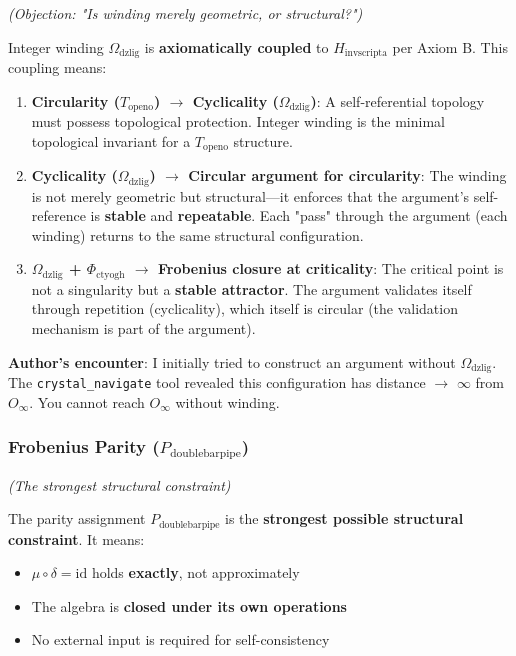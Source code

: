 \documentclass[12pt,a4paper]{article}
\begin{document}
\emph{(Objection: "Is winding merely geometric, or structural?")}

Integer winding $\Omega_{\text{dzlig}}$ is \textbf{axiomatically coupled} to $H_{\text{invscripta}}$ per Axiom B. This coupling means:

\begin{enumerate}
    \item \textbf{Circularity ($T_{\text{openo}}$) $\rightarrow$ Cyclicality ($\Omega_{\text{dzlig}}$)}: A self-referential topology must possess topological protection. Integer winding is the minimal topological invariant for a $T_{\text{openo}}$ structure.
    \item \textbf{Cyclicality ($\Omega_{\text{dzlig}}$) $\rightarrow$ Circular argument for circularity}: The winding is not merely geometric but structural---it enforces that the argument's self-reference is \textbf{stable} and \textbf{repeatable}. Each "pass" through the argument (each winding) returns to the same structural configuration.
    \item \textbf{$\Omega_{\text{dzlig}}$ + $\Phi_{\text{ctyogh}}$ $\rightarrow$ Frobenius closure at criticality}: The critical point is not a singularity but a \textbf{stable attractor}. The argument validates itself through repetition (cyclicality), which itself is circular (the validation mechanism is part of the argument).
\end{enumerate}

\textbf{Author's encounter}: I initially tried to construct an argument without $\Omega_{\text{dzlig}}$. The \texttt{crystal\_navigate} tool revealed this configuration has distance $\rightarrow$ $\infty$ from $O_{\infty}$. You cannot reach $O_{\infty}$ without winding.

\subsubsection{Frobenius Parity ($P_{\text{doublebarpipe}}$)}

\emph{(The strongest structural constraint)}

The parity assignment $P_{\text{doublebarpipe}}$ is the \textbf{strongest possible structural constraint}. It means:

\begin{itemize}
    \item $\mu \circ \delta = \text{id}$ holds \textbf{exactly}, not approximately
    \item The algebra is \textbf{closed under its own operations}
    \item No external input is required for self-consistency
\end{itemize}
\end{document}
